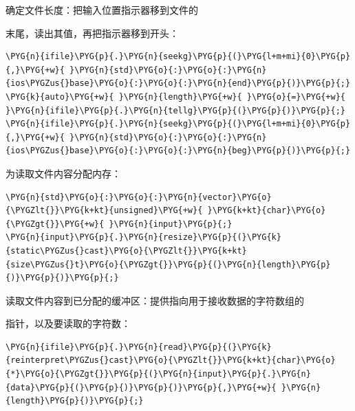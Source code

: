 
确定文件长度：把输入位置指示器移到文件的



末尾，读出其值，再把指示器移到开头：



\begin{codeblockbg}
\begin{Verbatim}[commandchars=\\\{\},breaklines=true,breakanywhere=true,fontsize=\codefont,xleftmargin=17bp]
\PYG{n}{ifile}\PYG{p}{.}\PYG{n}{seekg}\PYG{p}{(}\PYG{l+m+mi}{0}\PYG{p}{,}\PYG{+w}{ }\PYG{n}{std}\PYG{o}{:}\PYG{o}{:}\PYG{n}{ios\PYGZus{}base}\PYG{o}{:}\PYG{o}{:}\PYG{n}{end}\PYG{p}{)}\PYG{p}{;}
\PYG{k}{auto}\PYG{+w}{ }\PYG{n}{length}\PYG{+w}{ }\PYG{o}{=}\PYG{+w}{ }\PYG{n}{ifile}\PYG{p}{.}\PYG{n}{tellg}\PYG{p}{(}\PYG{p}{)}\PYG{p}{;}
\PYG{n}{ifile}\PYG{p}{.}\PYG{n}{seekg}\PYG{p}{(}\PYG{l+m+mi}{0}\PYG{p}{,}\PYG{+w}{ }\PYG{n}{std}\PYG{o}{:}\PYG{o}{:}\PYG{n}{ios\PYGZus{}base}\PYG{o}{:}\PYG{o}{:}\PYG{n}{beg}\PYG{p}{)}\PYG{p}{;}
\end{Verbatim}
\end{codeblockbg}



为读取文件内容分配内存：



\begin{codeblockbg}
\begin{Verbatim}[commandchars=\\\{\},breaklines=true,breakanywhere=true,fontsize=\codefont,xleftmargin=17bp]
\PYG{n}{std}\PYG{o}{:}\PYG{o}{:}\PYG{n}{vector}\PYG{o}{\PYGZlt{}}\PYG{k+kt}{unsigned}\PYG{+w}{ }\PYG{k+kt}{char}\PYG{o}{\PYGZgt{}}\PYG{+w}{ }\PYG{n}{input}\PYG{p}{;}
\PYG{n}{input}\PYG{p}{.}\PYG{n}{resize}\PYG{p}{(}\PYG{k}{static\PYGZus{}cast}\PYG{o}{\PYGZlt{}}\PYG{k+kt}{size\PYGZus{}t}\PYG{o}{\PYGZgt{}}\PYG{p}{(}\PYG{n}{length}\PYG{p}{)}\PYG{p}{)}\PYG{p}{;}
\end{Verbatim}
\end{codeblockbg}



读取文件内容到已分配的缓冲区：提供指向用于接收数据的字符数组的



指针，以及要读取的字符数：



\begin{codeblockbg}
\begin{Verbatim}[commandchars=\\\{\},breaklines=true,breakanywhere=true,fontsize=\codefont,xleftmargin=17bp]
\PYG{n}{ifile}\PYG{p}{.}\PYG{n}{read}\PYG{p}{(}\PYG{k}{reinterpret\PYGZus{}cast}\PYG{o}{\PYGZlt{}}\PYG{k+kt}{char}\PYG{o}{*}\PYG{o}{\PYGZgt{}}\PYG{p}{(}\PYG{n}{input}\PYG{p}{.}\PYG{n}{data}\PYG{p}{(}\PYG{p}{)}\PYG{p}{)}\PYG{p}{,}\PYG{+w}{ }\PYG{n}{length}\PYG{p}{)}\PYG{p}{;}
\end{Verbatim}
\end{codeblockbg}


